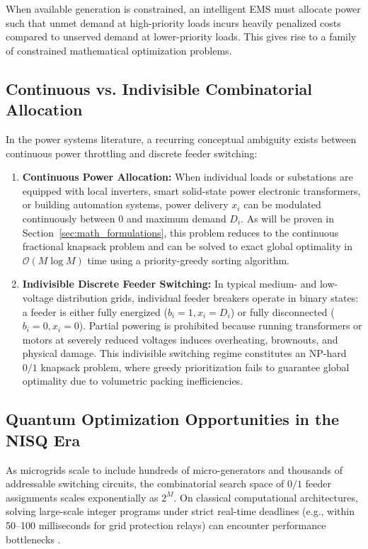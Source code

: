 \documentclass[11pt,a4paper]{article}
\theoremstyle{definition}
\theoremstyle{remark}
\begin{document}
When available generation is constrained, an intelligent EMS must allocate power such that unmet demand at high-priority loads incurs heavily penalized costs compared to unserved demand at lower-priority loads. This gives rise to a family of constrained mathematical optimization problems.

\subsection{Continuous vs. Indivisible Combinatorial Allocation}
In the power systems literature, a recurring conceptual ambiguity exists between continuous power throttling and discrete feeder switching:
\begin{enumerate}
    \item \textbf{Continuous Power Allocation:} When individual loads or substations are equipped with local inverters, smart solid-state power electronic transformers, or building automation systems, power delivery $x_i$ can be modulated continuously between $0$ and maximum demand $D_i$. As will be proven in Section~\ref{sec:math_formulations}, this problem reduces to the continuous fractional knapsack problem and can be solved to exact global optimality in $\mathcal{O}(M \log M)$ time using a priority-greedy sorting algorithm.
    \item \textbf{Indivisible Discrete Feeder Switching:} In typical medium- and low-voltage distribution grids, individual feeder breakers operate in binary states: a feeder is either fully energized ($b_i = 1, x_i = D_i$) or fully disconnected ($b_i = 0, x_i = 0$). Partial powering is prohibited because running transformers or motors at severely reduced voltages induces overheating, brownouts, and physical damage. This indivisible switching regime constitutes an NP-hard $0/1$ knapsack problem, where greedy prioritization fails to guarantee global optimality due to volumetric packing inefficiencies.
\end{enumerate}

\subsection{Quantum Optimization Opportunities in the NISQ Era}
As microgrids scale to include hundreds of micro-generators and thousands of addressable switching circuits, the combinatorial search space of $0/1$ feeder assignments scales exponentially as $2^M$. On classical computational architectures, solving large-scale integer programs under strict real-time deadlines (e.g., within 50--100 milliseconds for grid protection relays) can encounter performance bottlenecks \cite{chen2025}.
\end{document}
